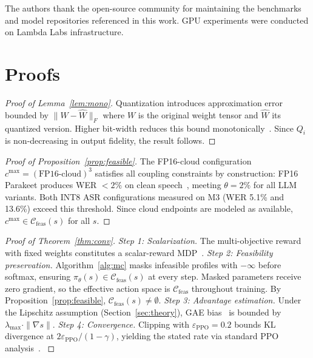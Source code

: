\documentclass{article}
\begin{document}
The authors thank the open-source community for maintaining the benchmarks and model repositories referenced in this work. GPU experiments were conducted on Lambda Labs infrastructure.




\appendix

\section{Proofs}
\label{app:proofs}

\begin{proof}[Proof of Lemma~\ref{lem:mono}]
Quantization introduces approximation error bounded by $\|W - \hat{W}\|_F$ where $W$ is the original weight tensor and $\hat{W}$ its quantized version. Higher bit-width reduces this bound monotonically~\citep{dettmers2022llmint8,han2016deep,nagel2020datafree}. Since $Q_i$ is non-decreasing in output fidelity, the result follows.
\end{proof}

\begin{proof}[Proof of Proposition~\ref{prop:feasible}]
The FP16-cloud configuration $c^{\max}=(\text{FP16-cloud})^3$ satisfies all coupling constraints by construction: FP16 Parakeet produces WER $<2\%$ on clean speech~\citep{parakeet2025}, meeting $\theta = 2\%$ for all LLM variants. Both INT8 ASR configurations measured on M3 (WER 5.1\% and 13.6\%) exceed this threshold. Since cloud endpoints are modeled as available, $c^{\max}\in\mathcal{C}_{\text{feas}}(s)$ for all $s$.
\end{proof}

\begin{proof}[Proof of Theorem~\ref{thm:conv}]
\emph{Step 1: Scalarization.} The multi-objective reward with fixed weights constitutes a scalar-reward MDP~\citep{hayes2022morl}. \emph{Step 2: Feasibility preservation.} Algorithm~\ref{alg:mc} masks infeasible profiles with $-\infty$ before softmax, ensuring $\pi_\theta(s)\in\mathcal{C}_{\text{feas}}(s)$ at every step. Masked parameters receive zero gradient, so the effective action space is $\mathcal{C}_{\text{feas}}$ throughout training. By Proposition~\ref{prop:feasible}, $\mathcal{C}_{\text{feas}}(s)\neq\emptyset$. \emph{Step 3: Advantage estimation.} Under the Lipschitz assumption (Section~\ref{sec:theory}), GAE bias~\citep{schulman2016gae} is bounded by $\lambda_{\max}\cdot\|\nabla s\|$. \emph{Step 4: Convergence.} Clipping with $\varepsilon_{\text{PPO}}=0.2$ bounds KL divergence at $2\varepsilon_{\text{PPO}}/(1-\gamma)$, yielding the stated rate via standard PPO analysis~\citep{schulman2017ppo}. \label{eq:eps_bound}
\end{proof}
\end{document}
